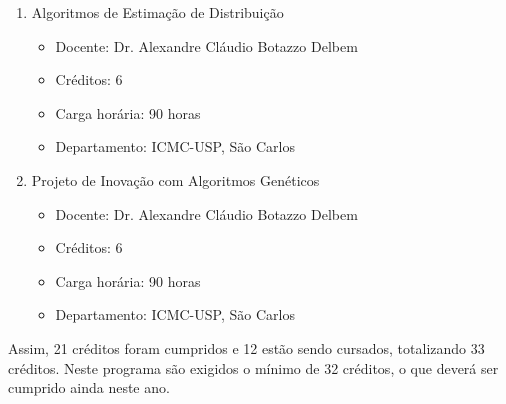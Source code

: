 \begin{enumerate}
	\item Algoritmos de Estimação de Distribuição
	\begin{itemize}
		\item Docente: Dr. Alexandre Cláudio Botazzo Delbem
		\item Créditos: 6
		\item Carga horária: 90 horas
		\item Departamento: ICMC-USP, São Carlos
	\end{itemize}
	\item Projeto de Inovação com Algoritmos Genéticos
	\begin{itemize}
		\item Docente: Dr. Alexandre Cláudio Botazzo Delbem
		\item Créditos: 6
		\item Carga horária: 90 horas
		\item Departamento: ICMC-USP, São Carlos
	\end{itemize}
\end{enumerate}

Assim, 21 créditos foram cumpridos e 12 estão sendo cursados, totalizando 33 créditos. Neste programa são exigidos o mínimo de 32 créditos, o que deverá ser cumprido ainda neste ano. 